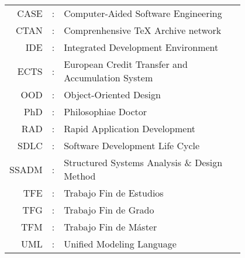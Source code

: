 \begin{tabular}{r r p{0.8\linewidth}}
CASE& : &Computer-Aided Software Engineering \\
CTAN& : &Comprenhensive \TeX{} Archive network \\
IDE& : &Integrated Development Environment \\
ECTS& : &European Credit Transfer and Accumulation System \\
OOD& : &Object-Oriented Design \\
PhD& : &Philosophiae Doctor \\
RAD& : &Rapid Application Development \\
SDLC& : &Software Development Life Cycle \\
SSADM& : &Structured Systems Analysis \& Design Method \\
TFE& : &Trabajo Fin de Estudios \\
TFG& : &Trabajo Fin de Grado \\
TFM& : &Trabajo Fin de Máster \\
UML& : &Unified Modeling Language
\end{tabular}